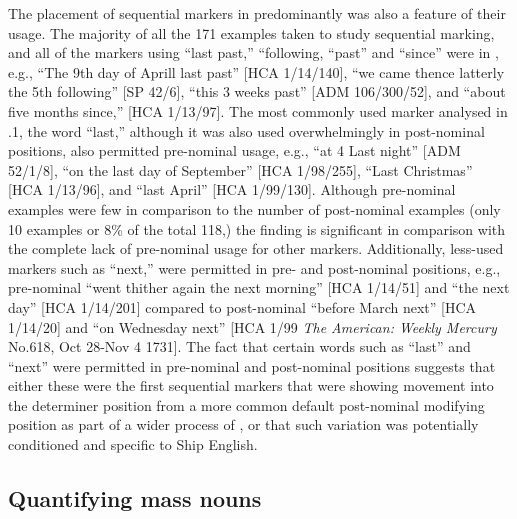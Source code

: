 The placement of sequential markers in predominantly  was also a feature of their usage. The majority of all the 171 examples taken to study sequential marking, and all of the markers using “last past,” “following, “past” and “since” were in , e.g., “The 9th day of Aprill last past” [HCA 1/14/140], “we came thence latterly the 5th following” [SP 42/6], “this 3 weeks past” [ADM 106/300/52], and “about five months since,” [HCA 1/13/97]. The most commonly used marker analysed in .1, the word “last,” although it was also used overwhelmingly in post-nominal positions, also permitted pre-nominal usage, e.g., “at 4 Last night” [ADM 52/1/8], “on the last day of September” [HCA 1/98/255], “Last Christmas” [HCA 1/13/96], and “last April” [HCA 1/99/130]. Although pre-nominal examples were few in comparison to the number of post-nominal examples (only 10 examples or 8\% of the total 118,) the finding is significant in comparison with the complete lack of pre-nominal usage for other markers. Additionally, less-used markers such as “next,” were permitted in pre- and post-nominal positions, e.g., pre-nominal “went thither again the next morning” [HCA 1/14/51] and “the next day” [HCA 1/14/201] compared to post-nominal “before March next” [HCA 1/14/20] and “on Wednesday next” [HCA 1/99 \textit{The American: Weekly Mercury} No.618, Oct 28-Nov 4 1731]. The fact that certain words such as “last” and “next” were permitted in pre-nominal and post-nominal positions suggests that either these were the first sequential markers that were showing movement into the determiner position from a more common default post-nominal modifying position as part of a wider process of , or that such variation was potentially conditioned and specific to Ship English. 

\subsection{{Quantifying mass nouns}}%

